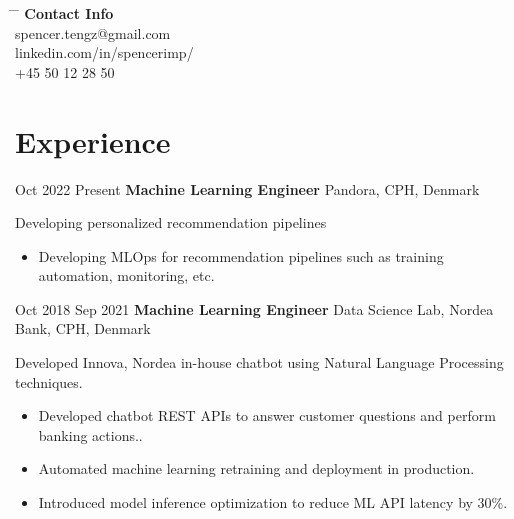 \documentclass[11pt]{article} %
\begin{document}
{\begin{minipage}[t]{0.22\textwidth}
\begin{tabbing} %
\hspace{2cm} \= \hspace{2cm} \= \kill %
\textbf{Contact Info} \\ 

spencer.tengz@gmail.com \\ %
linkedin.com/in/spencerimp/ \\ %
+45 50 12 28 50 \\ %
\end{tabbing}
\end{minipage}


\section{Experience}
\job
{Oct 2022 }{Present}
{\textbf{Machine Learning Engineer}}
{}
{Pandora, CPH, Denmark}
{
	
	Developing personalized recommendation pipelines
	\begin{itemize}[itemsep=0pt]
		\item Developing MLOps for recommendation pipelines such as  training automation, monitoring, etc.
	\end{itemize}
}
\job
{Oct 2018 }{Sep 2021}
{\textbf{Machine Learning Engineer}}
{}
{Data Science Lab, Nordea Bank, CPH, Denmark}
{
 
    Developed Innova, Nordea in-house chatbot using Natural Language Processing techniques.
    \begin{itemize}[itemsep=0pt]
    	\item  Developed chatbot REST APIs to answer customer questions and perform banking actions..
    	\item  Automated machine learning retraining and deployment in production.
    	\item  Introduced model inference optimization to reduce ML API latency by 30\%.
    \end{itemize}
}

}
\end{document}
